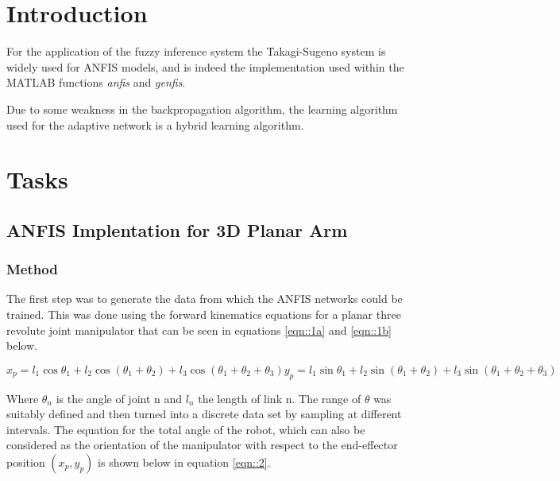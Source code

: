 \documentclass[a4paper, oneside, 12pt]{article}
\begin{document}
\section{Introduction}
For the application of the fuzzy inference system the Takagi-Sugeno system is widely used for ANFIS models, and is indeed the implementation used within the MATLAB functions \textit{anfis} and \textit{genfis}.

Due to some weakness in the backpropagation algorithm, the learning algorithm used for the adaptive network is a hybrid learning algorithm.


\cite{Jang1993}

\newpage
\section{Tasks}
\subsection{ANFIS Implentation for 3D Planar Arm}
\subsubsection{Method}

The first step was to generate the data from which the ANFIS networks could be trained. This was done using the forward kinematics equations for a planar three revolute joint manipulator that can be seen in equations \ref{eqn::1a} and \ref{eqn::1b} below.

\begin{subequations}
	\begin{equation}
		x_p = l_1 \cos \theta_1 + l_2 \cos (\theta_1 + \theta_2) + l_3 \cos ( \theta_1 + \theta_2 + \theta_3)
		\label{eqn::1a}
	\end{equation}
	\begin{equation}
		y_p = l_1 \sin \theta_1 + l_2 \sin (\theta_1 + \theta_2) + l_3 \sin ( \theta_1 + \theta_2 + \theta_3)
		\label{eqn::1b}
	\end{equation}
\end{subequations}

Where $\theta_n$ is the angle of joint n and $l_n$ the length of link n. The range of $\theta$ was suitably defined and then turned into a discrete data set by sampling at different intervals. The equation for the total angle of the robot, which can also be considered as the orientation of the manipulator with respect to the end-effector position $(x_p , y_p )$ is shown below in equation \ref{eqn::2}.
\end{document}
